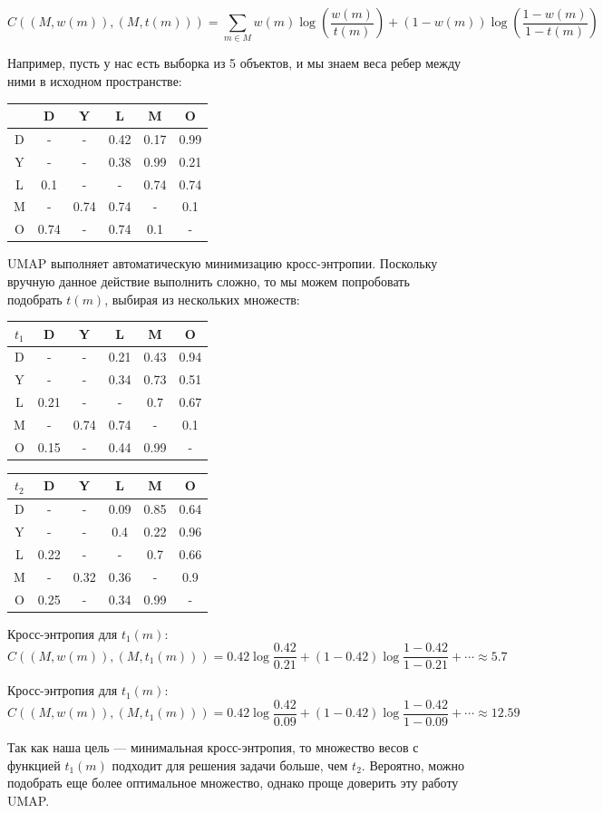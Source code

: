 \[C((M, w(m)), (M, t(m))) = \sum_{m \in M} w(m) \log \left(\frac{w(m)}{t(m)}\right) + (1 - w(m)) \log \left(\frac{1 - w(m)}{1 - t(m)}\right)\]

Например, пусть у нас есть выборка из 5 объектов, и мы знаем веса ребер между ними в исходном пространстве:
\begin{center}
	\begin{tabular}{|c||c|c|c|c|c|}
		\hline
		& D & Y & L & M & O\\
		\hline
		\hline
		D & - & - & 0.42 & 0.17 & 0.99\\
		\hline
		Y & - & - & 0.38 & 0.99 & 0.21\\
		\hline
		L & 0.1 & - & - & 0.74 & 0.74 \\
		\hline
		M & - & 0.74 & 0.74 & - & 0.1 \\
		\hline 
		O & 0.74 & - & 0.74 & 0.1 & -\\
		\hline 
	\end{tabular}
\end{center}

UMAP выполняет автоматическую минимизацию кросс-энтропии. Поскольку вручную данное действие выполнить сложно, то мы можем попробовать подобрать $t(m)$, выбирая из нескольких множеств:

\begin{center}
	\begin{tabular}{|c||c|c|c|c|c|}
		\hline
		$t_1$ & D & Y & L & M & O \\
		\hline
		\hline
		D & - & - & 0.21 & 0.43 & 0.94 \\
		\hline
		Y & - & - & 0.34 & 0.73 & 0.51 \\
		\hline
		L & 0.21 & - & - & 0.7 & 0.67 \\
		\hline
		M & - & 0.74 & 0.74 & - & 0.1 \\
		\hline 
		O & 0.15 & - & 0.44 & 0.99 & - \\
		\hline 
	\end{tabular}
	\begin{tabular}{|c||c|c|c|c|c|}
		\hline
		$t_2$ & D & Y & L & M & O\\
		\hline
		\hline
		D & - & - & 0.09 & 0.85 & 0.64\\
		\hline
		Y & - & - & 0.4 & 0.22 & 0.96\\
		\hline
		L & 0.22 & - & - & 0.7 & 0.66\\
		\hline
		M & - & 0.32 & 0.36 & - & 0.9 \\
		\hline 
		O & 0.25 & - & 0.34 & 0.99 & -\\
		\hline 
	\end{tabular}
\end{center}

Кросс-энтропия для $t_1(m)$:
\[C((M, w(m)), (M, t_1(m))) = 0.42\log \frac{0.42}{0.21} + (1-0.42)\log \frac{1-0.42}{1-0.21} + \cdots \approx 5.7\]

Кросс-энтропия для $t_1(m)$:
\[C((M, w(m)), (M, t_1(m))) = 0.42\log \frac{0.42}{0.09} + (1-0.42)\log \frac{1-0.42}{1-0.09} + \cdots \approx 12.59\]

Так как наша цель --- минимальная кросс-энтропия, то множество весов с функцией $t_1(m)$ подходит для решения задачи больше, чем $t_2$. Вероятно, можно подобрать еще более оптимальное множество, однако проще доверить эту работу UMAP.